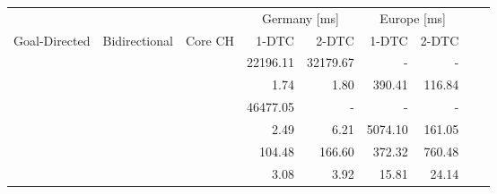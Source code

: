 \begin{tabular}{cccrrrrrr}
	\toprule
	              &               &         & \multicolumn{2}{c}{Germany [\si{\milli\second}]} & \multicolumn{2}{c}{Europe [\si{\milli\second}]}                 \\
	Goal-Directed & Bidirectional & Core CH & 1-DTC                                            & 2-DTC                                           & 1-DTC & 2-DTC \\
	\midrule
	\xmark        & \xmark        & \xmark  & 22196.11                                                & 32179.67                                               & -     & -     \\
	\cmark        & \xmark        & \xmark  & 1.74                                                & 1.80                                               & 390.41     & 116.84     \\
	\xmark        & \cmark        & \xmark  & 46477.05                                                & -                                               & -     & -     \\
	\cmark        & \cmark        & \xmark  & 2.49                                                & 6.21                                               & 5074.10     & 161.05     \\
	\xmark        & \cmark        & \cmark  & 104.48                                                & 166.60                                               & 372.32     & 760.48     \\
	\cmark        & \cmark        & \cmark  & 3.08                                                & 3.92                                               & 15.81     & 24.14     \\
	\bottomrule
\end{tabular}